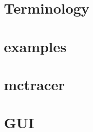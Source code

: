 \documentclass{article}
\begin{document}
\maketitle
\tableofcontents
\newpage

\section{Terminology} 
\section{examples} 
\section{mctracer} 
\section{GUI} 
\end{document}
